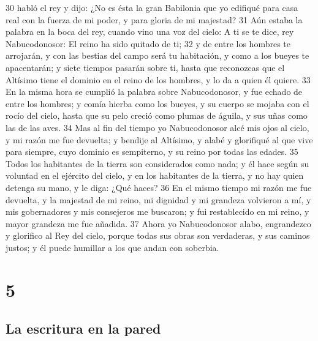 30 habló el rey y dijo: ¿No es ésta la gran Babilonia que yo edifiqué para casa real con la fuerza de mi poder, y para gloria de mi majestad?
31 Aún estaba la palabra en la boca del rey, cuando vino una voz del cielo: A ti se te dice, rey Nabucodonosor: El reino ha sido quitado de ti;
32 y de entre los hombres te arrojarán, y con las bestias del campo será tu habitación, y como a los bueyes te apacentarán; y siete tiempos pasarán sobre ti, hasta que reconozcas que el Altísimo tiene el dominio en el reino de los hombres, y lo da a quien él quiere.
33 En la misma hora se cumplió la palabra sobre Nabucodonosor, y fue echado de entre los hombres; y comía hierba como los bueyes, y su cuerpo se mojaba con el rocío del cielo, hasta que su pelo creció como plumas de águila, y sus uñas como las de las aves.
34 Mas al fin del tiempo yo Nabucodonosor alcé mis ojos al cielo, y mi razón me fue devuelta; y bendije al Altísimo, y alabé y glorifiqué al que vive para siempre, cuyo dominio es sempiterno, y su reino por todas las edades.
35 Todos los habitantes de la tierra son considerados como nada; y él hace según su voluntad en el ejército del cielo, y en los habitantes de la tierra, y no hay quien detenga su mano, y le diga: ¿Qué haces?
36 En el mismo tiempo mi razón me fue devuelta, y la majestad de mi reino, mi dignidad y mi grandeza volvieron a mí, y mis gobernadores y mis consejeros me buscaron; y fui restablecido en mi reino, y mayor grandeza me fue añadida.
37 Ahora yo Nabucodonosor alabo, engrandezco y glorifico al Rey del cielo, porque todas sus obras son verdaderas, y sus caminos justos; y él puede humillar a los que andan con soberbia.

\chapter{5}

\section*{La escritura en la pared}

